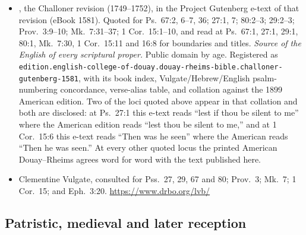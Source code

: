 \begin{itemize}[leftmargin=1.2em, itemsep=0.15em]
\item {}, the Challoner revision
(1749--1752), in the Project Gutenberg e-text of that revision (eBook 1581).
Quoted for Ps.\ 67:2, 6--7, 36; 27:1, 7; 80:2--3; 29:2--3; Prov.\ 3:9--10; Mk.\
7:31--37; 1 Cor.\ 15:1--10, and read at Ps.\ 67:1, 27:1, 29:1, 80:1, Mk.\ 7:30,
1 Cor.\ 15:11 and 16:8 for boundaries and titles. \textit{Source of the English
of every scriptural proper.} Public domain by age. Registered as
\nolinkurl{edition.english-college-of-douay.douay-rheims-bible.challoner-gutenberg-1581},
with its book index, Vulgate/Hebrew/English psalm-numbering concordance,
verse-alias table, and collation against the 1899 American edition. Two of the
loci quoted above appear in that collation and both are disclosed: at Ps.\ 27:1
this e-text reads ``lest if thou be silent to me'' where the American edition
reads ``lest thou be silent to me,'' and at 1 Cor.\ 15:6 this e-text reads
``Then was he seen'' where the American reads ``Then he was seen.'' At every
other quoted locus the printed American Douay--Rheims agrees word for word with
the text published here.
\item Clementine Vulgate, consulted for Pss.\ 27, 29, 67 and 80; Prov.\ 3;
Mk.\ 7; 1 Cor.\ 15; and Eph.\ 3:20. \url{https://www.drbo.org/lvb/}
\end{itemize}

\subsection*{Patristic, medieval and later reception}

